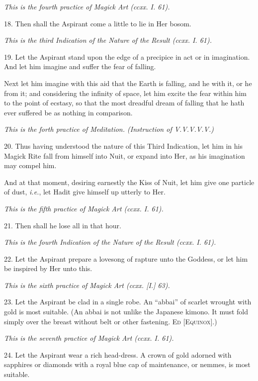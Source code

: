 \textit{This is the fourth practice of Magick Art (ccxx. I. 61).}

18. Then shall the Aspirant come a little to lie in Her bosom.

\textit{This is the third Indication of the Nature of the Result (ccxx. I. 61).}

19. Let the Aspirant stand upon the edge of a precipice in act or in imagination. And let him imagine and suffer the fear of falling.

Next let him imagine with this aid that the Earth is falling, and he with it, or he from it; and considering the infinity of space, let him excite the fear within him to the point of ecstasy, so that the most dreadful dream of falling that he hath ever suffered be as nothing in comparison.

\textit{This is the forth practice of Meditation. (Instruction of V.V.V.V.V.)}

20. Thus having understood the nature of this Third Indication, let him in his Magick Rite fall from himself into Nuit, or expand into Her, as his imagination may compel him.

And at that moment, desiring earnestly the Kiss of Nuit, let him give one particle of dust, \textit{i.e.}, let Hadit give himself up utterly to Her.

\textit{This is the fifth practice of Magick Art (ccxx. I. 61).}

21. Then shall he lose all in that hour.

\textit{This is the fourth Indication of the Nature of the Result (ccxx. I. 61).}

22. Let the Aspirant prepare a lovesong of rapture unto the Goddess, or let him be inspired by Her unto this.

\textit{This is the sixth practice of Magick Art (ccxx. [I.] 63).}

23. Let the Aspirant be clad in a single robe. An \enquote{abbai} of scarlet wrought with gold is most suitable. (An abbai is not unlike the Japanese kimono. It must fold simply over the breast without belt or other fastening. \textsc{Ed [Equinox]}.)

\textit{This is the seventh practice of Magick Art (ccxx. I. 61).}

24. Let the Aspirant wear a rich head-dress. A crown of gold adorned with sapphires or diamonds with a royal blue cap of maintenance, or nemmes, is most suitable.

